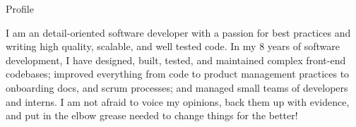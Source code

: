 \documentclass[]{mcdowellcv}
\begin{document}
	\makeheader

	\begin{cvsection}{Profile}
		\vspace{2pt}
		\begin{cvsubsection}{}{}{}
			I am an detail-oriented software developer with a passion for best practices and writing high quality, scalable, and well tested code. In my 8 years of software development, I have designed, built, tested, and maintained complex front-end codebases; improved everything from code to product management practices to onboarding docs, and scrum processes; and managed small teams of developers and interns. I am not afraid to voice my opinions, back them up with evidence, and put in the elbow grease needed to change things for the better!
		\end{cvsubsection}
	\end{cvsection}
\end{document}
